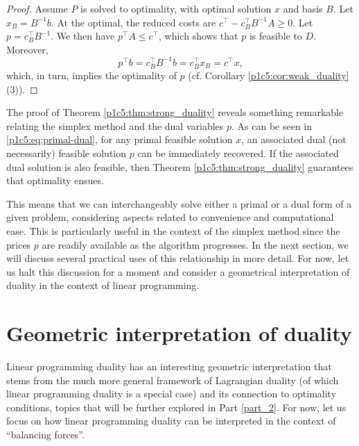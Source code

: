 \begin{proof}
	Assume $P$ is solved to optimality, with optimal solution $x$ and basis $B$. Let $x_B = B^{-1}b$. At the optimal, the reduced costs are $c^\top - c_B^\top B^{-1}A \geq 0$. Let $p = c_B^\top B^{-1}$. We then have $p^\top A \leq c^\top$, which shows that $p$ is feasible to $D$. Moreover,
%
	\begin{equation} \label{p1c5:eq:primal-dual}
		p^\top b = c_B^\top B^{-1}b = c_B^\top x_B = c^\top x,			
	\end{equation}
%
which, in turn, implies the optimality of $p$ (cf. Corollary \ref{p1c5:cor:weak_duality} (3)). \qedhere
\end{proof}

The proof of Theorem \ref{p1c5:thm:strong_duality} reveals something remarkable relating the simplex method and the dual variables $p$. As can be seen in \eqref{p1c5:eq:primal-dual}, for any primal feasible solution $x$, an associated dual (not necessarily) feasible solution $p$ can be immediately recovered. If the associated dual solution is also feasible, then Theorem \ref{p1c5:thm:strong_duality} guarantees that optimality ensues.

This means that we can interchangeably solve either a primal or a dual form of a given problem, considering aspects related to convenience and computational ease. This is particularly useful in the context of the simplex method since the prices $p$ are readily available as the algorithm progresses. In the next section, we will discuss several practical uses of this relationship in more detail. For now, let us halt this discussion for a moment and consider a geometrical interpretation of duality in the context of linear programming.


\section{Geometric interpretation of duality}

Linear programming duality has an interesting geometric interpretation that stems from the much more general framework of Lagrangian duality (of which linear programming duality is a special case) and its connection to optimality conditions, topics that will be further explored in Part \ref{part_2}. For now, let us focus on how linear programming duality can be interpreted in the context of ``balancing forces''. 


